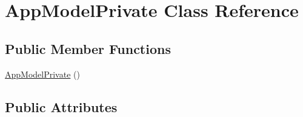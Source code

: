 \hypertarget{class_app_model_private}{}\section{App\+Model\+Private Class Reference}
\label{class_app_model_private}
\subsection*{Public Member Functions}
\begin{DoxyCompactItemize}
\item 
\hyperlink{class_app_model_private_ac7e4e160306c7ff9c771d2dd34c243ac}{App\+Model\+Private} ()
\end{DoxyCompactItemize}
\subsection*{Public Attributes}
